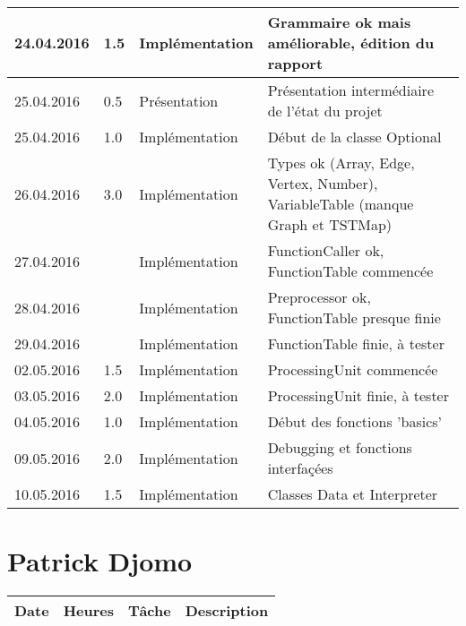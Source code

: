 \documentclass[french]{article}
\begin{document}
\begin{tabular}{p{}|p{}|p{}|p{}}
		24.04.2016 & 1.5 & Implémentation & Grammaire ok mais améliorable, édition du rapport\\ 
		\hline
		25.04.2016 & 0.5 & Présentation & Présentation intermédiaire de l'état du projet\\
		25.04.2016 & 1.0 & Implémentation & Début de la classe Optional\\
		26.04.2016 & 3.0 & Implémentation & Types ok (Array, Edge, Vertex, Number), VariableTable (manque Graph et TSTMap)\\
		27.04.2016 & & Implémentation & FunctionCaller ok, FunctionTable commencée\\
		28.04.2016 & & Implémentation & Preprocessor ok, FunctionTable presque finie\\
		29.04.2016 & & Implémentation & FunctionTable finie, à tester\\
		\hline
		02.05.2016 & 1.5 & Implémentation & ProcessingUnit commencée\\
		03.05.2016 & 2.0 & Implémentation & ProcessingUnit finie, à tester\\
		04.05.2016 & 1.0 & Implémentation & Début des fonctions 'basics'\\
		\hline 
		09.05.2016 & 2.0 & Implémentation & Debugging et fonctions interfaçées\\
		10.05.2016 & 1.5 & Implémentation & Classes Data et Interpreter\\
	\end{tabular}
	
	\section*{Patrick Djomo}
	\begin{tabular}{p{}|p{}|p{}|p{}}
		Date&Heures&Tâche&Description\\
		\hline
	\end{tabular}
	
\end{document}
